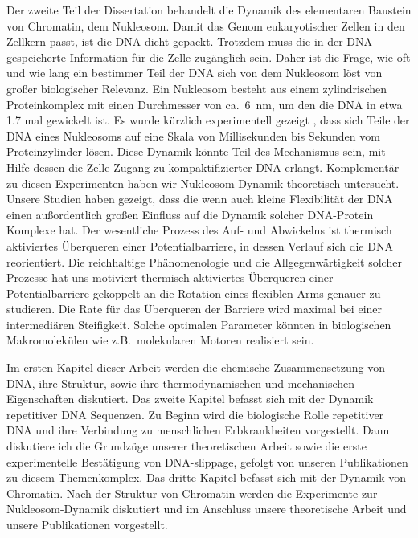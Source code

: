 Der zweite Teil der Dissertation behandelt die Dynamik des elementaren Baustein von Chromatin, dem Nukleosom.
Damit das Genom eukaryotischer Zellen in den Zellkern passt, ist die DNA dicht gepackt. 
Trotzdem muss die in der DNA gespeicherte Information f\"ur die Zelle zug\"anglich sein. 
Daher ist die Frage, wie oft und wie lang ein bestimmer Teil der DNA sich von dem Nukleosom l\"ost
 von gro\ss{}er biologischer Relevanz.
Ein Nukleosom besteht aus einem zylindrischen Proteinkomplex
mit einen Durchmesser von ca.~6~nm, um den die DNA in etwa 1.7 mal gewickelt ist. 
Es wurde k\"urzlich experimentell gezeigt \cite{Li_NatureStructMolBio_05,Tomschik_PNAS_05}, 
dass sich Teile der DNA eines Nukleosoms auf eine Skala von Millisekunden bis Sekunden
vom Proteinzylinder l\"osen. Diese Dynamik k\"onnte Teil des Mechanismus sein, mit Hilfe dessen
die Zelle Zugang zu kompaktifizierter DNA erlangt.  Komplement\"ar zu diesen Experimenten haben
wir Nukleosom-Dynamik theoretisch untersucht. Unsere Studien haben gezeigt, dass
die wenn auch kleine Flexibilit\"at der DNA einen au\ss{}ordentlich gro\ss{}en Einfluss auf die Dynamik 
solcher DNA-Protein Komplexe hat. Der wesentliche Prozess des Auf- und Abwickelns ist  thermisch
aktiviertes \"Uberqueren einer Potentialbarriere, in dessen Verlauf sich die DNA reorientiert. 
Die reichhaltige Ph\"anomenologie und die Allgegenw\"artigkeit solcher Prozesse hat uns 
motiviert thermisch aktiviertes \"Uberqueren einer Potentialbarriere gekoppelt an die 
Rotation eines flexiblen Arms genauer zu studieren. Die Rate f\"ur das \"Uberqueren der Barriere
wird maximal bei einer intermedi\"aren Steifigkeit. 
Solche optimalen Parameter k\"onnten in biologischen Makromolek\"ulen
wie z.B.~molekularen Motoren realisiert sein.

Im ersten Kapitel dieser Arbeit werden die chemische Zusammensetzung von DNA, ihre Struktur, sowie
ihre thermodynamischen und mechanischen Eigenschaften diskutiert. Das zweite Kapitel
befasst sich mit der Dynamik repetitiver DNA Sequenzen. Zu Beginn wird die biologische Rolle
repetitiver DNA und ihre Verbindung zu menschlichen Erbkrankheiten vorgestellt. Dann diskutiere
ich die Grundz\"uge unserer theoretischen Arbeit sowie die erste experimentelle Best\"atigung von 
DNA-slippage, gefolgt von unseren Publikationen zu diesem 
Themenkomplex. Das dritte Kapitel befasst sich mit der Dynamik von Chromatin. Nach der
Struktur von Chromatin werden die Experimente zur Nukleosom-Dynamik diskutiert und im 
Anschluss unsere theoretische Arbeit und unsere Publikationen vorgestellt. 
